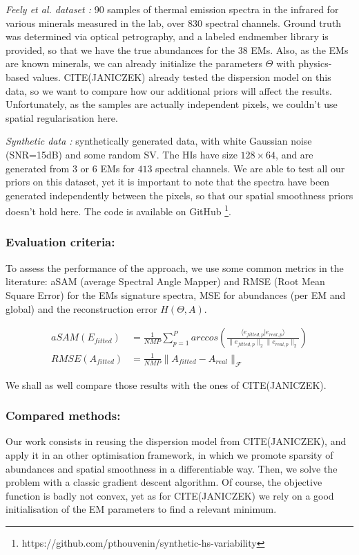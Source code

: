 \documentclass{article}
\begin{document}
\textit{Feely et al. dataset \cite{feely}:} 90 samples of thermal emission spectra in the infrared for various minerals measured in the lab, over $830$ spectral channels. Ground truth was determined via optical petrography, and a labeled endmember library is provided, so that we have the true abundances for the $38$ EMs. Also, as the EMs are known minerals, we can already initialize the parameters $\Theta$ with physics-based values. CITE(JANICZEK) already tested the dispersion model on this data, so we want to compare how our additional priors will affect the results. Unfortunately, as the samples are actually independent pixels, we couldn't use spatial regularisation here.

\textit{Synthetic data \cite{thouvenin}:} synthetically generated data, with white Gaussian noise (SNR=15dB) and some random SV. The HIs have size $128 \times 64$, and are generated from $3$ or $6$ EMs for $413$ spectral channels. We are able to test all our priors on this dataset, yet it is important to note that the spectra have been generated independently between the pixels, so that our spatial smoothness priors doesn't hold here. The code is available on GitHub \footnote{https://github.com/pthouvenin/synthetic-hs-variability}.

\subsubsection{Evaluation criteria:}
To assess the performance of the approach, we use some common metrics in the literature: aSAM (average Spectral Angle Mapper) and RMSE (Root Mean Square Error) for the EMs signature spectra, MSE for abundances (per EM and global) and the reconstruction error $H(\Theta, A)$.

\begin{align*}
  aSAM(E_{fitted}) &= \frac{1}{N M P} \sum_{p=1}^P arccos \left( \frac{\langle e_{fitted, p} | e_{real, p} \rangle}{\| e_{fitted, p} \|_2 \| e_{real, p} \|_2} \right)\\
  RMSE(A_{fitted}) &= \frac{1}{N M P} \| A_{fitted} - A_{real} \|_{\mathcal{F}}
\end{align*}

We shall as well compare those results with the ones of CITE(JANICZEK).

\subsubsection{Compared methods:}
Our work consists in reusing the dispersion model from CITE(JANICZEK), and apply it in an other optimisation framework, in which we promote sparsity of abundances and spatial smoothness in a differentiable way. Then, we solve the problem with a classic gradient descent algorithm. Of course, the objective function is badly not convex, yet as for CITE(JANICZEK) we rely on a good initialisation of the EM parameters to find a relevant minimum.
\end{document}
